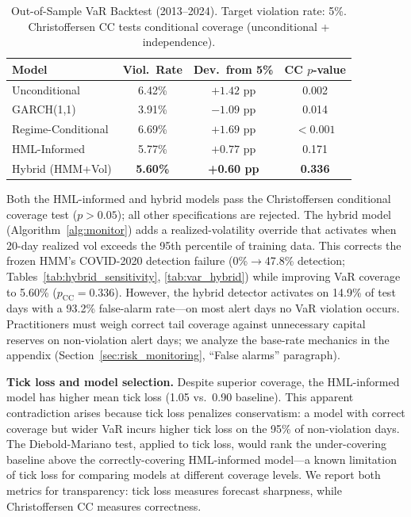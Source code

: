 \documentclass[sigconf,anonymous]{acmart}
\begin{document}
\begin{table}[t]
\centering
\setlength{\tabcolsep}{4pt}
\caption[Out-of-Sample VaR Backtest (2013--2024)]{Out-of-Sample VaR Backtest (2013--2024). Target violation rate: 5\%.
Christoffersen CC tests conditional coverage (unconditional + independence).}
\label{tab:var}
\small
\begin{tabular}{lccc}
\toprule
Model & Viol.\ Rate & Dev.\ from 5\% & CC $p$-value \\
\midrule
Unconditional & 6.42\% & $+1.42$ pp & 0.002 \\
GARCH(1,1) & 3.91\% & $-1.09$ pp & 0.014 \\
Regime-Conditional & 6.69\% & $+1.69$ pp & $< 0.001$ \\
HML-Informed & 5.77\% & $+0.77$ pp & 0.171 \\
Hybrid (HMM+Vol) & \textbf{5.60\%} & \textbf{+0.60 pp} & \textbf{0.336} \\
\bottomrule
\end{tabular}
\end{table}
\setlength{\tabcolsep}{6pt}

Both the HML-informed and hybrid models pass the Christoffersen conditional
coverage test ($p > 0.05$); all other specifications are rejected. The hybrid
model (Algorithm~\ref{alg:monitor}) adds a realized-volatility override that
activates when 20-day realized vol exceeds the 95th percentile of training
data. This corrects the frozen HMM's COVID-2020 detection failure
(0\%$\to$47.8\% detection; Tables~\ref{tab:hybrid_sensitivity},
\ref{tab:var_hybrid}) while improving VaR coverage to 5.60\%
($p_{\text{CC}} = 0.336$). However, the hybrid detector activates on 14.9\% of
test days with a 93.2\% false-alarm rate---on most alert days no VaR violation
occurs. Practitioners must weigh correct tail coverage against unnecessary capital
reserves on non-violation alert days; we analyze the base-rate mechanics in the
appendix (Section~\ref{sec:risk_monitoring}, ``False alarms'' paragraph).

\textbf{Tick loss and model selection.}
Despite superior coverage, the HML-informed model has higher mean tick loss
(1.05 vs.\ 0.90 baseline). This apparent contradiction arises because tick loss
penalizes conservatism: a model with correct coverage but wider VaR incurs higher
tick loss on the 95\% of non-violation days. The Diebold-Mariano test, applied to
tick loss, would rank the under-covering baseline above the correctly-covering
HML-informed model---a known limitation of tick loss for comparing models at
different coverage levels. We report both metrics for transparency: tick loss
measures forecast sharpness, while Christoffersen CC measures correctness.
\end{document}
